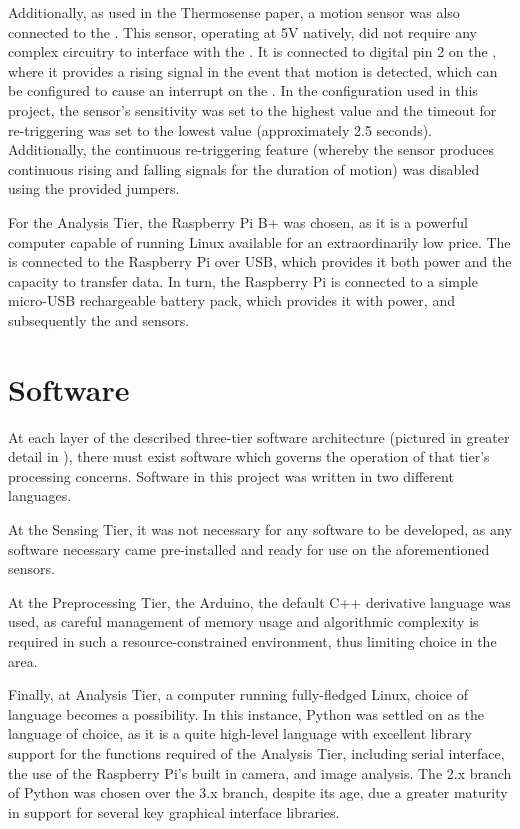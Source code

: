 \documentclass[../thesis/thesis.tex]{subfiles}
\begin{document}
Additionally, as used in the Thermosense paper, a \pir motion sensor \cite{AdafruitPIR} was also connected to the \ard. This sensor, operating at 5V natively, did not require any complex circuitry to interface with the \ard. It is connected to digital pin 2 on the \ard, where it provides a rising signal in the event that motion is detected, which can be configured to cause an interrupt on the \ard. In the configuration used in this project, the sensor's sensitivity was set to the highest value and the timeout for re-triggering was set to the lowest value (approximately 2.5 seconds). Additionally, the continuous re-triggering feature (whereby the sensor produces continuous rising and falling signals for the duration of motion) was disabled using the provided jumpers. 


For the Analysis Tier, the Raspberry Pi B+ was chosen, as it is a powerful computer capable of running Linux available for an extraordinarily low price. The \ard is connected to the Raspberry Pi over USB, which provides it both power and the capacity to transfer data. In turn, the Raspberry Pi is connected to a simple micro-USB rechargeable battery pack, which provides it with power, and subsequently the \ard and sensors.

\section{Software}

At each layer of the described three-tier software architecture (pictured in greater detail in ), there must exist software which governs the operation of that tier's processing concerns. Software in this project was written in two different languages.

At the Sensing Tier, it was not necessary for any software to be developed, as any software necessary came pre-installed and ready for use on the aforementioned sensors.

At the Preprocessing Tier, the Arduino, the default C++ derivative language was used, as careful management of memory usage and algorithmic complexity is required in such a resource-constrained environment, thus limiting choice in the area.

Finally, at Analysis Tier, a computer running fully-fledged Linux, choice of language becomes a possibility. In this instance, Python was settled on as the language of choice, as it is a quite high-level language with excellent library support for the functions required of the Analysis Tier, including serial interface, the use of the Raspberry Pi's built in camera, and image analysis. The 2.x branch of Python was chosen over the 3.x branch, despite its age, due a greater maturity in support for several key graphical interface libraries.
\end{document}
